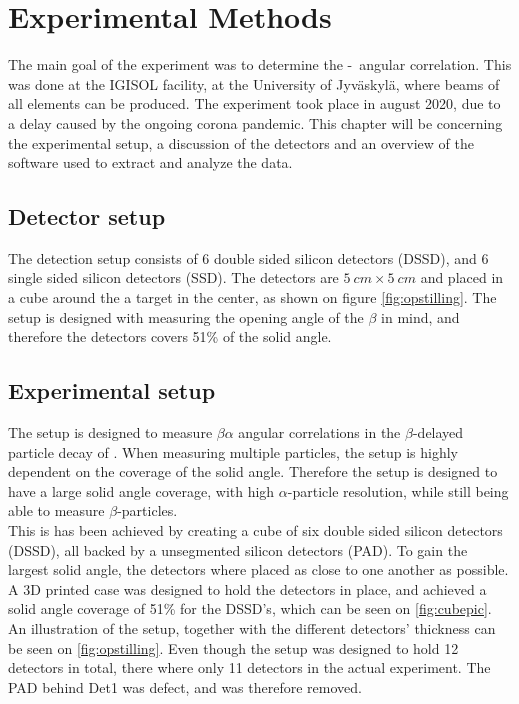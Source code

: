 \chapter{Experimental Methods}
The main goal of the experiment was to determine the \be-\al\ angular correlation. This was done at the IGISOL facility, at the University of Jyväskylä, where beams of all elements can be produced. The experiment took place in august 2020, due to a delay caused by the ongoing corona pandemic. This chapter will be concerning the experimental setup, a discussion of the detectors and an overview of the software used to extract and analyze the data. 

\section{Detector setup}
The detection setup consists of 6 double sided silicon detectors (DSSD), and 6 single sided silicon detectors (SSD). 
The detectors are $\SI{5}{cm} \times \SI{5}{cm}$ and placed in a cube around the a target in the center, as shown on figure \cref{fig:opstilling}. The setup is designed with measuring the opening angle of the $\beta$ in mind, and therefore the detectors covers 51\% of the solid angle. \\


\section{Experimental setup}
The setup is designed to measure $\beta\alpha$ angular correlations in the $\beta$-delayed particle decay of . When measuring multiple particles, the setup is highly dependent on the coverage of the solid angle. Therefore the setup is designed to have a large solid angle coverage, with high $\alpha$-particle resolution, while still being able to measure $\beta$-particles. \\
This is has been achieved by creating a cube of six double sided silicon detectors (DSSD), all backed by a unsegmented silicon detectors (PAD). To gain the largest solid angle, the detectors where placed as close to one another as possible. A 3D printed case was designed to hold the detectors in place, and achieved a solid angle coverage of 51\% for the DSSD's, which can be seen on \cref{fig:cubepic}. An illustration of the setup, together with the different detectors' thickness can be seen on \cref{fig:opstilling}. 
Even though the setup was designed to hold 12 detectors in total, there where only 11 detectors in the actual experiment. The PAD behind Det1 was defect, and was therefore removed. 


